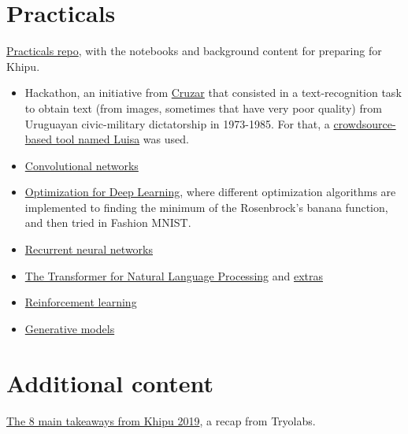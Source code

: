 \documentclass[12pt, english]{article}
\begin{document}
\section{Practicals}

\href{https://github.com/khipu-ai/practicals-2019}{Practicals repo}, with the notebooks and background content for preparing for Khipu.

\begin{itemize}
  \item Hackathon, an initiative from \href{http://cruzar.uy/}{Cruzar} that consisted in a text-recognition task to obtain text (from images, sometimes that have very poor quality) from Uruguayan civic-military dictatorship in 1973-1985. For that, a \href{https://www.fing.edu.uy/mh/luisa/}{crowdsource-based tool named Luisa} was used.
  \item \href{https://colab.research.google.com/github/khipu-ai/practicals-2019/blob/master/1a_conv_nets.ipynb}{Convolutional networks}
  \item \href{https://colab.research.google.com/github/khipu-ai/practicals-2019/blob/master/1a_conv_nets.ipynb}{Optimization for Deep Learning}, where different optimization algorithms are implemented to finding the minimum of the Rosenbrock's banana function, and then tried in Fashion MNIST.
  \item \href{https://colab.research.google.com/github/khipu-ai/practicals-2019/blob/master/2a_recurrent_nets.ipynb}{Recurrent neural networks}
  \item \href{https://colab.research.google.com/github/khipu-ai/practicals-2019/blob/master/2b_nlp_transformer.ipynb}{The Transformer for Natural Language Processing} and \href{https://colab.research.google.com/github/khipu-ai/practicals-2019/blob/master/2b_nlp_transformer_extra.ipynb}{extras}
  \item \href{https://colab.research.google.com/github/khipu-ai/practicals-2019/blob/master/3a_reinforcement_learning.ipynb}{Reinforcement learning}
  \item \href{https://colab.research.google.com/github/khipu-ai/practicals-2019/blob/master/3b_generative_models.ipynb}{Generative models}
\end{itemize}


\section{Additional content}

\href{https://tryolabs.com/blog/2019/11/22/the-8-main-takeaways-from-khipu-2019/}{The 8 main takeaways from Khipu 2019}, a recap from Tryolabs.
\end{document}
